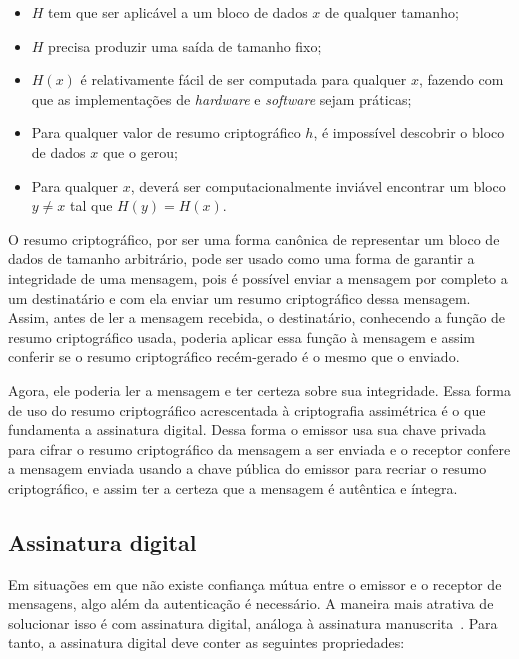 \documentclass{article}
\begin{document}
\begin{itemize}
  \item $H$ tem que ser aplicável a um bloco de dados $x$ de qualquer tamanho;

  \item $H$ precisa produzir uma saída de tamanho fixo;

  \item $H(x)$ é relativamente fácil de ser computada para qualquer $x$,
      fazendo com que as implementações de \textit{hardware}
        e \textit{software} sejam práticas;

  \item Para qualquer valor de resumo criptográfico $h$, é impossível descobrir
      o bloco de dados $x$ que o gerou;

  \item Para qualquer $x$, deverá ser computacionalmente inviável encontrar um
      bloco $y \neq x$ tal que $H(y) = H(x)$.
\end{itemize}

O resumo criptográfico, por ser uma forma canônica de representar um bloco de
dados de tamanho arbitrário, pode ser usado como uma forma de garantir
a integridade de uma mensagem, pois é possível enviar a mensagem por completo
a um destinatário e com ela enviar um resumo criptográfico dessa
mensagem. Assim, antes de ler a mensagem recebida, o destinatário, conhecendo
a função de resumo criptográfico usada, poderia aplicar essa função à mensagem
e assim conferir se o resumo criptográfico recém-gerado é o mesmo que
o enviado.

Agora, ele poderia ler a mensagem e ter certeza sobre sua integridade. Essa
forma de uso do resumo criptográfico acrescentada à criptografia assimétrica
é o que fundamenta a assinatura digital. Dessa forma o emissor usa sua chave
privada para cifrar o resumo criptográfico da mensagem a ser enviada
e o receptor confere a mensagem enviada usando a chave pública do emissor para
recriar o resumo criptográfico, e assim ter a certeza que a mensagem
é autêntica e íntegra.

\subsection{Assinatura digital}\label{subsec:digitalsig}

Em situações em que não existe confiança mútua entre o emissor e o receptor de
mensagens, algo além da autenticação é necessário. A maneira mais atrativa de
solucionar isso é com assinatura digital, análoga à assinatura
manuscrita~\cite{Stallings:book:2016}. Para tanto, a assinatura digital deve
conter as seguintes propriedades:
\end{document}

